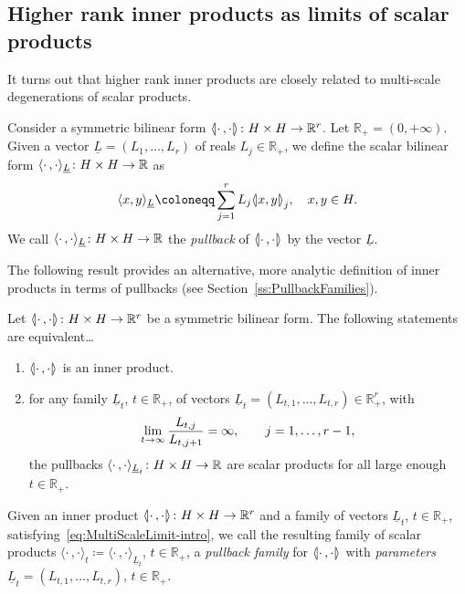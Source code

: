 \documentclass[AHL,Unicode,longabstracts]{cedram}
\newcommand{\innone}[2]{{\langle#2\rangle_{#1}}}
\newcommand{\llangle}{\mathopen{\langle\mkern -3.1mu\lvert}}
\newcommand{\rrangle}{\mathclose{\rvert\mkern -3.1mu\rangle}}
\newcommand{\highinn}[2]{{\llangle#2\rrangle_{#1}}}
\newcommand{\R}{\mathbb{R}}
\renewcommand*{\to}{\mathchoice{\longrightarrow}{\rightarrow}{\rightarrow}{\rightarrow}}
\newcommand*{\relabel}{\renewcommand{\labelenumi}{(\theenumi)}}
\newcommand*{\romanenumi}{\renewcommand*{\theenumi}{\roman{enumi}}\relabel}
\begin{document}
\subsection{Higher rank inner products as limits of scalar products} 

It turns out that higher rank inner products are closely related to multi-scale degenerations of scalar products.


Consider a symmetric bilinear form $\highinn{}{\cdot \,, \cdot} \colon H \times H \to \R^r$. Let $\R_+ = (0, +\infty)$. Given a vector $\underline L = (L_1, \dots, L_r)$ of reals $L_j \in \R_+$, we define the scalar bilinear form $\innone{\underline L}{\cdot\,, \cdot}\colon H\times H \to \R$ as
\[
\innone{\underline L}{x, y} \coloneqq \sum_{j=1}^r L_j \highinn{j}{x, y}, \quad x,y \in H.
\]
We call $\innone{\underline L}{\cdot\,, \cdot}\colon H\times H \to \R$ the \emph{pullback} of $\highinn{}{\cdot \,, \cdot}$ by the vector $\underline L$.


The following result provides an alternative, more analytic definition of inner products in terms of pullbacks (see Section~\ref{ss:PullbackFamilies}).

\begin{theo}\label{thm:pullback-intro}
Let $\highinn{}{\cdot\,, \cdot} \colon H \times H \to \R^r$ be a symmetric bilinear form. The following statements are equivalent\dots
\begin{enumerate}\romanenumi
\item\label{theo1.5.1} $\highinn{}{\cdot\,, \cdot}$ is an inner product.

\item\label{theo1.5.2} for any family $\underline L_t$, $t \in \R_+$, of vectors $\underline L_t = (L_{t,1}, \dots, L_{t,r}) \in \R_+^r$, with
\begin{equation}\label{eq:MultiScaleLimit-intro}
\lim_{t \to \infty} \frac{L_{t,j}}{L_{t, j+1}} = \infty, \qquad j=1, \dots, r-1,
\end{equation}
the pullbacks $\innone{\underline L_t}{\cdot\,, \cdot}\colon H\times H \to \R$ are scalar products for all large enough $t \in \R_+$.
\end{enumerate}
\end{theo}

Given an inner product $\highinn{}{\cdot\,, \cdot} \colon H \times H \to \R^r$ and a family of vectors $\underline L_t$, $t \in \R_+$, satisfying~\eqref{eq:MultiScaleLimit-intro}, we call the resulting family of scalar products $ \innone{t}{\cdot\,, \cdot} \coloneqq \innone{\underline L_t}{\cdot\,, \cdot}$, $t \in \R_+$, a \emph{pullback family} for $\highinn{}{\cdot\,, \cdot}$ with \emph{parameters} $\underline L_t = (L_{t,1}, \dots, L_{t,r})$, $t \in \R_+$.
\end{document}
